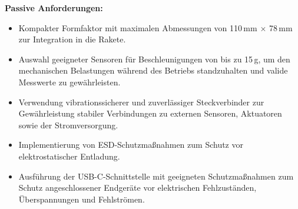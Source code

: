 \textbf{Passive Anforderungen:}
\begin{itemize}
    \item Kompakter Formfaktor mit maximalen Abmessungen von 110\,mm $\times$ 78\,mm zur Integration in die Rakete.
    \item Auswahl geeigneter Sensoren für Beschleunigungen von bis zu 15\,g, um den mechanischen Belastungen während des Betriebs standzuhalten und valide Messwerte zu gewährleisten.
    \item Verwendung vibrationssicherer und zuverlässiger Steckverbinder zur Gewährleistung stabiler Verbindungen zu externen Sensoren, Aktuatoren sowie der Stromversorgung.
    \item Implementierung von ESD-Schutzmaßnahmen zum Schutz vor elektrostatischer Entladung.
    \item Ausführung der USB-C-Schnittstelle mit geeigneten Schutzmaßnahmen zum Schutz angeschlossener Endgeräte vor elektrischen Fehlzuständen, Überspannungen und Fehlströmen.
\end{itemize}



